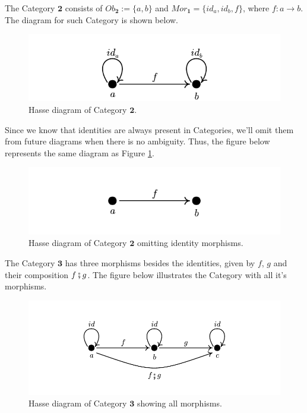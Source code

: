 \begin{example}
  The Category $\bm 2$ consists of $Ob_{\bm 2} := \{a, b\}$ and $Mor_{\bm 1} = \{id_a, id_b, f\}$,
  where $f:a \to b$.
  The diagram for such Category is shown below.
  \begin{figure}[H]
    \begin{center}
      \includegraphics{./notebooks/2Cat}
    \end{center}
    \caption{Hasse diagram of Category $\bm 2$.}
    \label{fig:2Cat}
  \end{figure}

Since we know that identities are always present in Categories, we'll
omit them from future diagrams when there is no ambiguity. Thus,
the figure below represents the same diagram as Figure \ref{fig:2Cat}.
\begin{figure}[H]
  \begin{center}
    \includegraphics{./notebooks/2Catsimple}
  \end{center}
  \caption{Hasse diagram of Category $\bm 2$ omitting identity morphisms.}
  \label{fig:2Catsimple}
\end{figure}

The Category $\bm 3$ has three morphisms besides the identities, given
by $f$, $g$ and their composition $f \fatsemi g$. The figure below
illustrates the Category with all it's morphisms.

\begin{figure}[H]
  \begin{center}
    \includegraphics{./notebooks/3CatComplete}
  \end{center}
  \caption{Hasse diagram of Category $\bm 3$ showing all morphisms.}
  \label{fig:3Catcomplete}
\end{figure}


\end{example}
